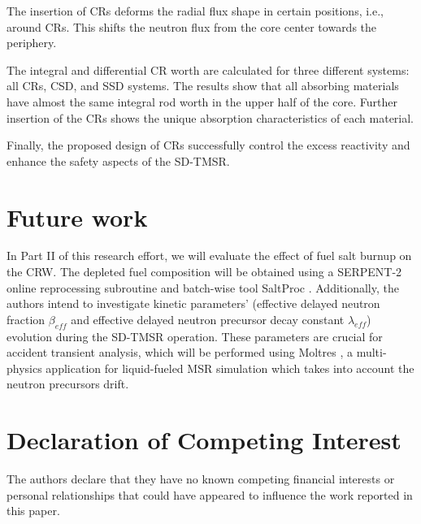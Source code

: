 The insertion of CRs deforms the radial flux shape in certain positions, i.e., around CRs. This shifts the neutron flux from the core center towards the periphery.

The integral and differential CR worth are calculated for three 
different systems: all CRs, CSD, and SSD systems. The results show 
that all absorbing materials have almost the same integral rod worth in the 
upper half of the core. Further insertion of the CRs shows the unique 
absorption characteristics of each material.

Finally, the proposed design of CRs successfully control the excess reactivity and enhance the safety aspects of the SD-TMSR.

\section{Future work}
In Part II of this research effort, we will evaluate the effect of fuel salt 
burnup on the CRW. The depleted fuel composition will be obtained using a
SERPENT-2 online reprocessing subroutine \cite{aufiero2013extended} and 
batch-wise tool SaltProc \cite{rykhlevskii_arfc/saltproc_2018, 
rykhlevskii_milestone_2019}. Additionally, the authors intend to investigate 
kinetic parameters' (effective delayed neutron fraction $\beta_{eff}$ and 
effective delayed neutron precursor decay constant $\lambda_{eff}$) evolution 
during the SD-TMSR operation. These parameters are crucial for accident 
transient analysis, which will be performed using Moltres 
\cite{lindsay_introduction_2018}, a multi-physics application for liquid-fueled MSR 
simulation which takes into account the neutron precursors drift.

\section{Declaration of Competing Interest}

The authors declare that they have no known competing financial interests or personal relationships that could have appeared to influence the work reported in this paper.
